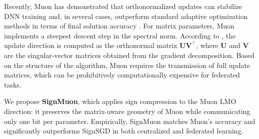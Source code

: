 \documentclass[letterpaper]{article} %
\begin{document}
Recently, Muon has demonstrated that orthonormalized updates can stabilize DNN training and, in several cases, outperform standard adaptive optimization methods in terms of final solution accuracy \cite{jordan2024muon, bernstein2024old, shah2025practical}. For matrix parameters, Muon implements a steepest descent step in the spectral norm. According to \citet{jordan2024muon}, the update direction is computed as the orthonormal matrix $\mathbf{U}\mathbf{V}^{\top}$, where $\mathbf{U}$ and $\mathbf{V}$ are the singular-vector matrices obtained from the gradient decomposition. Based on the structure of the algorithm, Muon requires the transmission of full update matrices, which can be prohibitively computationally expensive for federated tasks.

We propose \textbf{SignMuon}, which applies sign compression to the Muon LMO direction: it preserves the matrix-aware geometry of Muon while communicating only one bit per parameter. Empirically, SignMuon matches Muon's accuracy and significantly outperforms SignSGD in both centralized and federated learning.
\end{document}
